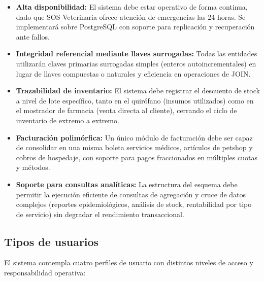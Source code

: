 \begin{itemize}
	\item \textbf{Alta disponibilidad:} El sistema debe estar operativo de forma continua, dado que SOS Veterinaria ofrece atención de emergencias las 24 horas. Se implementará sobre PostgreSQL con soporte para replicación y recuperación ante fallos.
	\item \textbf{Integridad referencial mediante llaves surrogadas:} Todas las entidades utilizarán claves primarias surrogadas simples (enteros autoincrementales) en lugar de llaves compuestas o naturales y eficiencia en operaciones de JOIN.
	\item \textbf{Trazabilidad de inventario:} El sistema debe registrar el descuento de stock a nivel de lote específico, tanto en el quirófano (insumos utilizados) como en el mostrador de farmacia (venta directa al cliente), cerrando el ciclo de inventario de extremo a extremo.
	\item \textbf{Facturación polimórfica:} Un único módulo de facturación debe ser capaz de consolidar en una misma boleta servicios médicos, artículos de petshop y cobros de hospedaje, con soporte para pagos fraccionados en múltiples cuotas y métodos.
	\item \textbf{Soporte para consultas analíticas:} La estructura del esquema debe permitir la ejecución eficiente de consultas de agregación y cruce de datos complejos (reportes epidemiológicos, análisis de stock, rentabilidad por tipo de servicio) sin degradar el rendimiento transaccional.
\end{itemize}

\subsection{Tipos de usuarios}

El sistema contempla cuatro perfiles de usuario con distintos niveles de acceso y responsabilidad operativa:

